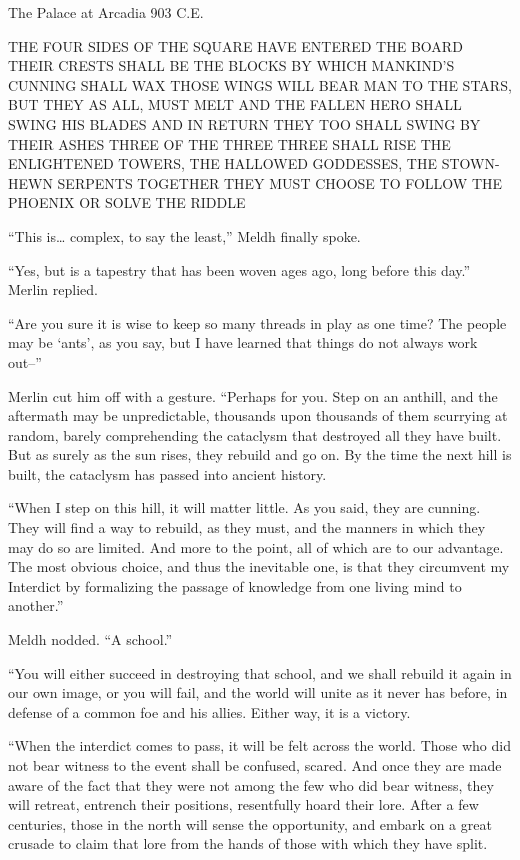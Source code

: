 The Palace at Arcadia
903 C.E.

THE FOUR SIDES OF THE SQUARE HAVE ENTERED THE BOARD
THEIR CRESTS SHALL BE THE BLOCKS BY WHICH MANKIND’S CUNNING SHALL WAX
THOSE WINGS WILL BEAR MAN TO THE STARS, BUT THEY AS ALL, MUST MELT
AND THE FALLEN HERO SHALL SWING HIS BLADES
AND IN RETURN THEY TOO SHALL SWING
BY THEIR ASHES THREE OF THE THREE THREE SHALL RISE
THE ENLIGHTENED TOWERS, THE HALLOWED GODDESSES, THE STOWN-HEWN SERPENTS
TOGETHER THEY MUST CHOOSE TO FOLLOW THE PHOENIX OR SOLVE THE RIDDLE

“This is… complex, to say the least,” Meldh finally spoke.

“Yes, but is a tapestry that has been woven ages ago, long before this day.” Merlin replied.

“Are you sure it is wise to keep so many threads in play as one time? The people may be ‘ants’, as you say, but I have learned that things do not always work out–”

Merlin cut him off with a gesture. “Perhaps for you. Step on an anthill, and the aftermath may be unpredictable, thousands upon thousands of them scurrying at random, barely comprehending the cataclysm that destroyed all they have built. But as surely as the sun rises, they rebuild and go on. By the time the next hill is built, the cataclysm has passed into ancient history.

“When I step on this hill, it will matter little. As you said, they are cunning. They will find a way to rebuild, as they must, and the manners in which they may do so are limited. And more to the point, all of which are to our advantage. The most obvious choice, and thus the inevitable one, is that they circumvent my Interdict by formalizing the passage of knowledge from one living mind to another.”

Meldh nodded. “A school.”

“You will either succeed in destroying that school, and we shall rebuild it again in our own image, or you will fail, and the world will unite as it never has before, in defense of a common foe and his allies. Either way, it is a victory.

“When the interdict comes to pass, it will be felt across the world. Those who did not bear witness to the event shall be confused, scared. And once they are made aware of the fact that they were not among the few who did bear witness, they will retreat, entrench their positions, resentfully hoard their lore. After a few centuries, those in the north will sense the opportunity, and embark on a great crusade to claim that lore from the hands of those with which they have split.

